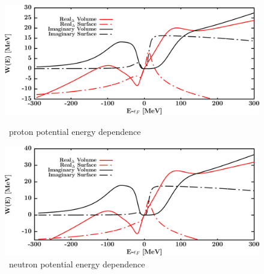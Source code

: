 \begin{figure}[hbtp]
    \centering
    \begin{minipage}{0.42\textwidth}
        \centering
        \includegraphics[width=\textwidth]{figures/ni58_protonPotentials.png}
        \caption*{\footnotesize\niEight\ proton potential energy dependence}
        \label{DOMFitData_ni58_proton_potentialComponent_energy}
    \end{minipage}\hspace{6pt}
    \begin{minipage}{0.42\textwidth}
        \centering
        \includegraphics[width=\textwidth]{figures/ni58_neutronPotentials.png}
        \caption*{\footnotesize\niEight\ neutron potential energy dependence}
        \label{DOMFitData_ni58_neutron_potentialComponent_energy}
    \end{minipage}
\end{figure}
